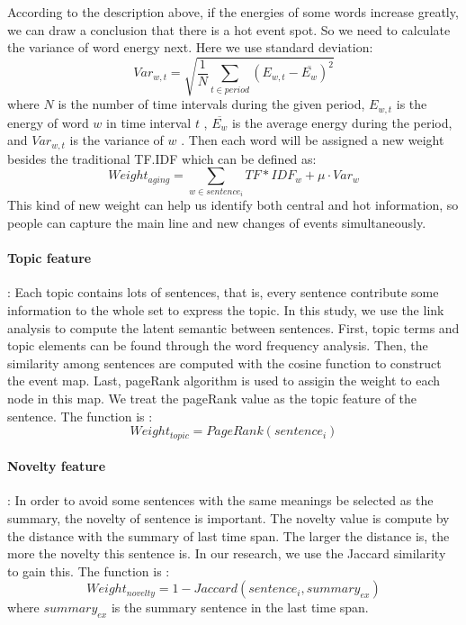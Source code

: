 \documentclass{acm_proc_article-sp}
\begin{document}
According to the description above, if the energies of some words increase greatly, we can draw a conclusion that there is a hot event spot. So we need to calculate the variance of word energy next. Here we use standard deviation:
\begin{equation}
Var_{w,t} = \sqrt{ \frac{1}{N} \sum_{t \in period}(E_{w,t}- \overline{E_{w}})^2}
\end{equation}
where $N$ is the number of time intervals during the given period, $E_{w,t}$  is the energy of word $w$  in time interval $t$ , $\overline{E_{w}}$  is the average energy during the period, and $Var_{w,t}$  is the variance of $w$ .
Then each word will be assigned a new weight besides the traditional TF.IDF which can be defined as:
 \begin{equation}
Weight_{aging}=\sum_{w \in sentence_i}TF*IDF_{w} + \mu \cdot Var_{w}
\end{equation}
This kind of new weight can help us identify both central and hot information, so people can capture the main line and new changes of events simultaneously.

\paragraph{Topic feature}: Each topic contains lots of sentences, that is, every sentence contribute some information to the whole set to express the topic. In this study, we use the link analysis to compute the latent semantic between sentences. First, topic terms and topic elements can be found through the word frequency analysis. Then, the similarity among sentences are computed with the cosine function to construct the event map. Last, pageRank algorithm is used to assigin the weight to each node in this map. We treat the pageRank value as the topic feature of the sentence. The function is :
\begin{equation}
Weight_{topic} = PageRank(sentence_i)
\end{equation}

\paragraph{Novelty feature}: In order to avoid some sentences with the same meanings be selected as the summary, the novelty of sentence is important. The novelty value is compute by the distance with the summary of last time span. The larger the distance is, the more the novelty this sentence is. In our research, we use the Jaccard similarity to gain this. The function is :
\begin{equation}
Weight_{novelty} = 1 - Jaccard(sentence_i, summary_{ex})
\end{equation}
where $summary_{ex}$ is the summary sentence in the last time span.
\end{document}
